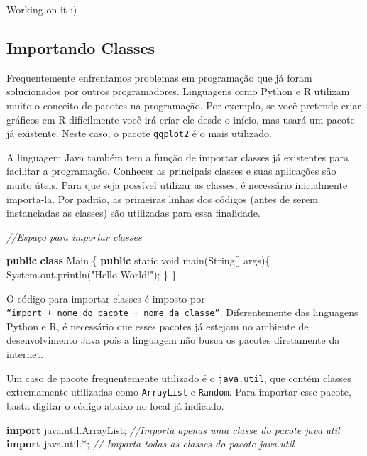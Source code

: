 \documentclass[
]{book}
\newenvironment{Shaded}{\begin{snugshade}}{\end{snugshade}}
\newcommand{\BuiltInTok}[1]{#1}
\newcommand{\CommentTok}[1]{\textcolor[rgb]{0.56,0.35,0.01}{\textit{#1}}}
\newcommand{\DataTypeTok}[1]{\textcolor[rgb]{0.13,0.29,0.53}{#1}}
\newcommand{\FunctionTok}[1]{\textcolor[rgb]{0.00,0.00,0.00}{#1}}
\newcommand{\ImportTok}[1]{#1}
\newcommand{\KeywordTok}[1]{\textcolor[rgb]{0.13,0.29,0.53}{\textbf{#1}}}
\newcommand{\NormalTok}[1]{#1}
\newcommand{\StringTok}[1]{\textcolor[rgb]{0.31,0.60,0.02}{#1}}
\begin{document}
Working on it :)

\hypertarget{importando-classes}{%
\subsection{Importando Classes}\label{importando-classes}}

Frequentemente enfrentamos problemas em programação que já foram solucionados por outros programadores. Linguagens como Python e R utilizam muito o conceito de pacotes na programação. Por exemplo, se você pretende criar gráficos em R dificilmente você irá criar ele desde o início, mas usará um pacote já existente. Neste caso, o pacote \texttt{ggplot2} é o mais utilizado.

A linguagem Java também tem a função de importar classes já existentes para facilitar a programação. Conhecer as principais classes e suas aplicações são muito úteis. Para que seja possível utilizar as classes, é necessário inicialmente importa-la. Por padrão, as primeiras linhas dos códigos (antes de serem instanciadas as classes) são utilizadas para essa finalidade.

\begin{Shaded}
\begin{Highlighting}[]
\CommentTok{//Espaço para importar classes}

\KeywordTok{public} \KeywordTok{class}\NormalTok{ Main \{}
    \KeywordTok{public} \DataTypeTok{static} \DataTypeTok{void} \FunctionTok{main}\NormalTok{(}\BuiltInTok{String}\NormalTok{[] args)\{}
        \BuiltInTok{System}\NormalTok{.}\FunctionTok{out}\NormalTok{.}\FunctionTok{println}\NormalTok{(}\StringTok{"Hello World!"}\NormalTok{);}
\NormalTok{    \}}
\NormalTok{\}}
\end{Highlighting}
\end{Shaded}

O código para importar classes é imposto por \texttt{“import\ +\ nome\ do\ pacote\ +\ nome\ da\ classe”}. Diferentemente das linguagens Python e R, é necessário que esses pacotes já estejam no ambiente de desenvolvimento Java pois a linguagem não busca os pacotes diretamente da internet.

Um caso de pacote frequentemente utilizado é o \texttt{java.util}, que contém classes extremamente utilizadas como \texttt{ArrayList} e \texttt{Random}. Para importar esse pacote, basta digitar o código abaixo no local já indicado.

\begin{Shaded}
\begin{Highlighting}[]
\KeywordTok{import}\ImportTok{ java.util.ArrayList;} \CommentTok{//Importa apenas uma classe do pacote java.util}
\KeywordTok{import}\ImportTok{ java.util.*;} \CommentTok{// Importa todas as classes do pacote java.util}
\end{Highlighting}
\end{Shaded}
\end{document}
